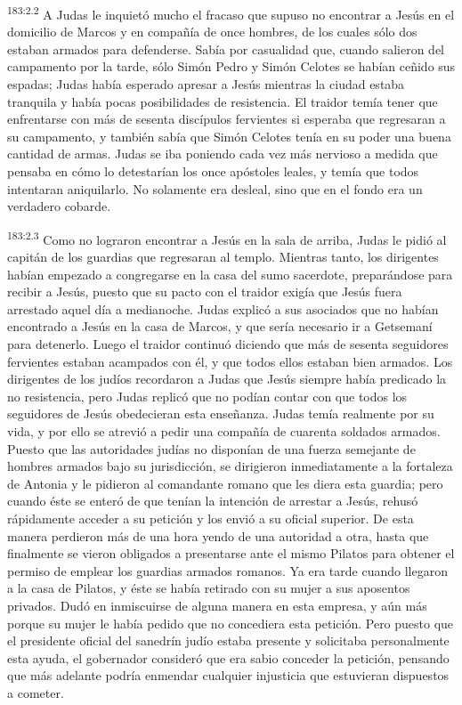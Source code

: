 \par 
\textsuperscript{183:2.2} A Judas le inquietó mucho el fracaso que supuso no encontrar a Jesús en el domicilio de Marcos y en compañía de once hombres, de los cuales sólo dos estaban armados para defenderse. Sabía por casualidad que, cuando salieron del campamento por la tarde, sólo Simón Pedro y Simón Celotes se habían ceñido sus espadas; Judas había esperado apresar a Jesús mientras la ciudad estaba tranquila y había pocas posibilidades de resistencia. El traidor temía tener que enfrentarse con más de sesenta discípulos fervientes si esperaba que regresaran a su campamento, y también sabía que Simón Celotes tenía en su poder una buena cantidad de armas. Judas se iba poniendo cada vez más nervioso a medida que pensaba en cómo lo detestarían los once apóstoles leales, y temía que todos intentaran aniquilarlo. No solamente era desleal, sino que en el fondo era un verdadero cobarde.

\par 
\textsuperscript{183:2.3} Como no lograron encontrar a Jesús en la sala de arriba, Judas le pidió al capitán de los guardias que regresaran al templo. Mientras tanto, los dirigentes habían empezado a congregarse en la casa del sumo sacerdote, preparándose para recibir a Jesús, puesto que su pacto con el traidor exigía que Jesús fuera arrestado aquel día a medianoche. Judas explicó a sus asociados que no habían encontrado a Jesús en la casa de Marcos, y que sería necesario ir a Getsemaní para detenerlo. Luego el traidor continuó diciendo que más de sesenta seguidores fervientes estaban acampados con él, y que todos ellos estaban bien armados. Los dirigentes de los judíos recordaron a Judas que Jesús siempre había predicado la no resistencia, pero Judas replicó que no podían contar con que todos los seguidores de Jesús obedecieran esta enseñanza. Judas temía realmente por su vida, y por ello se atrevió a pedir una compañía de cuarenta soldados armados. Puesto que las autoridades judías no disponían de una fuerza semejante de hombres armados bajo su jurisdicción, se dirigieron inmediatamente a la fortaleza de Antonia y le pidieron al comandante romano que les diera esta guardia; pero cuando éste se enteró de que tenían la intención de arrestar a Jesús, rehusó rápidamente acceder a su petición y los envió a su oficial superior. De esta manera perdieron más de una hora yendo de una autoridad a otra, hasta que finalmente se vieron obligados a presentarse ante el mismo Pilatos para obtener el permiso de emplear los guardias armados romanos. Ya era tarde cuando llegaron a la casa de Pilatos, y éste se había retirado con su mujer a sus aposentos privados. Dudó en inmiscuirse de alguna manera en esta empresa, y aún más porque su mujer le había pedido que no concediera esta petición. Pero puesto que el presidente oficial del sanedrín judío estaba presente y solicitaba personalmente esta ayuda, el gobernador consideró que era sabio conceder la petición, pensando que más adelante podría enmendar cualquier injusticia que estuvieran dispuestos a cometer.

